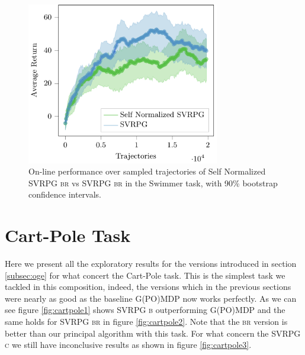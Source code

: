 \begin{figure}[h]
	\begin{minipage}[h]{1\textwidth}
		\centering
		\includegraphics[width=0.75\textwidth]{Images/Experiments/swimmer_SVRPG_vs_SN_SVRPG_B_reuse.pdf}
		\vspace{-0.1in}
		\caption{On-line performance over sampled trajectories of Self Normalized \acs{SVRPG} \textsc{br} vs \acs{SVRPG} \textsc{br} in the Swimmer task, with 90\% bootstrap confidence intervals.}
		\label{fig:swimmereleven}
	\end{minipage}
	\vspace{-0.15in}
\end{figure}



\clearpage
\vspace{-0.05in}
\section{Cart-Pole Task}
\vspace{-0.05in}
Here we present all the exploratory results for the versions introduced in section \ref{subsec:oge} for what concert the Cart-Pole task. This is the simplest task we tackled in this composition, indeed, the versions which in the previous sections were nearly as good as the baseline G(PO)MDP now works perfectly. As we can see figure \ref{fig:cartpole1} shows \acs{SVRPG} \textsc{b} outperforming G(PO)MDP and the same holds for \acs{SVRPG} \textsc{br} in figure \ref{fig:cartpole2}. Note that the \textsc{br} version is better than our principal algorithm with this task. For what concern the \acs{SVRPG} \textsc{c} we still have inconclusive results as shown in figure \ref{fig:cartpole3}.

